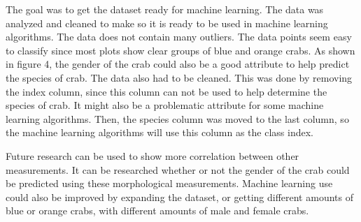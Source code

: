 \documentclass[
]{article}
\begin{document}
The goal was to get the dataset ready for machine learning. The data was
analyzed and cleaned to make so it is ready to be used in machine
learning algorithms. The data does not contain many outliers. The data
points seem easy to classify since most plots show clear groups of blue
and orange crabs. As shown in figure 4, the gender of the crab could
also be a good attribute to help predict the species of crab. The data
also had to be cleaned. This was done by removing the index column,
since this column can not be used to help determine the species of crab.
It might also be a problematic attribute for some machine learning
algorithms. Then, the species column was moved to the last column, so
the machine learning algorithms will use this column as the class index.

Future research can be used to show more correlation between other
measurements. It can be researched whether or not the gender of the crab
could be predicted using these morphological measurements. Machine
learning use could also be improved by expanding the dataset, or getting
different amounts of blue or orange crabs, with different amounts of
male and female crabs.

\newpage
\end{document}
